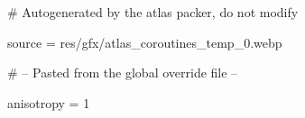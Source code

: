 # Autogenerated by the atlas packer, do not modify

source = res/gfx/atlas_coroutines_temp_0.webp

# -- Pasted from the global override file --

anisotropy = 1
